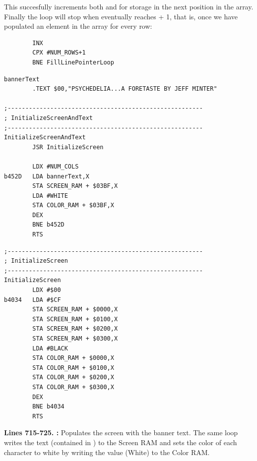 This succesfully increments both  and  for storage in the next position in
the array. Finally the loop will stop when  eventually reaches  + 1, that is, once we have
populated an element in the array for every row:

\begin{lstlisting}
        INX 
        CPX #NUM_ROWS+1
        BNE FillLinePointerLoop
\end{lstlisting}
%

\clearpage
\begin{lstlisting}[caption = A routine that fills the screen with black and the title text.]
bannerText   
        .TEXT $00,"PSYCHEDELIA...A FORETASTE BY JEFF MINTER"

;-------------------------------------------------------
; InitializeScreenAndText
;-------------------------------------------------------
InitializeScreenAndText   
        JSR InitializeScreen

        LDX #NUM_COLS
b452D   LDA bannerText,X
        STA SCREEN_RAM + $03BF,X
        LDA #WHITE
        STA COLOR_RAM + $03BF,X
        DEX 
        BNE b452D
        RTS 
\end{lstlisting}

\bigskip
\bigskip
\bigskip
\bigskip
\bigskip
\bigskip
\bigskip
\bigskip
\bigskip
\begin{lstlisting}[caption = Fills the screen with black]
;-------------------------------------------------------
; InitializeScreen
;-------------------------------------------------------
InitializeScreen   
        LDX #$00
b4034   LDA #$CF
        STA SCREEN_RAM + $0000,X
        STA SCREEN_RAM + $0100,X
        STA SCREEN_RAM + $0200,X
        STA SCREEN_RAM + $0300,X
        LDA #BLACK
        STA COLOR_RAM + $0000,X
        STA COLOR_RAM + $0100,X
        STA COLOR_RAM + $0200,X
        STA COLOR_RAM + $0300,X
        DEX 
        BNE b4034
        RTS 

\end{lstlisting}
\clearpage

\textbf{Lines 715-725. :} Populates the screen with the banner text. The same loop writes
the text (contained in ) to the Screen RAM and sets the color of each character to white by writing the
value  (White) to the Color RAM.

